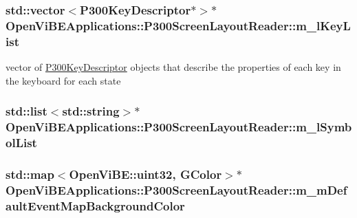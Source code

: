 \label{classOpenViBEApplications_1_1P300ScreenLayoutReader_aa159d2cad50b6c8d28333c6168e02afe}
\hypertarget{classOpenViBEApplications_1_1P300ScreenLayoutReader_ac97fdfda4e8e6aca27c6d039938949ef}{
\subsubsection[{m\_\-lKeyList}]{\setlength{\rightskip}{0pt plus 5cm}std::vector$<${\bf P300KeyDescriptor}$\ast$$>$$\ast$ {\bf OpenViBEApplications::P300ScreenLayoutReader::m\_\-lKeyList}}}
\label{classOpenViBEApplications_1_1P300ScreenLayoutReader_ac97fdfda4e8e6aca27c6d039938949ef}
vector of \hyperlink{classOpenViBEApplications_1_1P300KeyDescriptor}{P300KeyDescriptor} objects that describe the properties of each key in the keyboard for each state \hypertarget{classOpenViBEApplications_1_1P300ScreenLayoutReader_a373004186aac4d4600f3afeafbd5d570}{
\subsubsection[{m\_\-lSymbolList}]{\setlength{\rightskip}{0pt plus 5cm}std::list$<$std::string$>$$\ast$ {\bf OpenViBEApplications::P300ScreenLayoutReader::m\_\-lSymbolList}}}
\label{classOpenViBEApplications_1_1P300ScreenLayoutReader_a373004186aac4d4600f3afeafbd5d570}
\hypertarget{classOpenViBEApplications_1_1P300ScreenLayoutReader_aa9457e6485c54a8646f7dcae8b487f11}{
\subsubsection[{m\_\-mDefaultEventMapBackgroundColor}]{\setlength{\rightskip}{0pt plus 5cm}std::map$<$OpenViBE::uint32, {\bf GColor}$>$$\ast$ {\bf OpenViBEApplications::P300ScreenLayoutReader::m\_\-mDefaultEventMapBackgroundColor}}}
